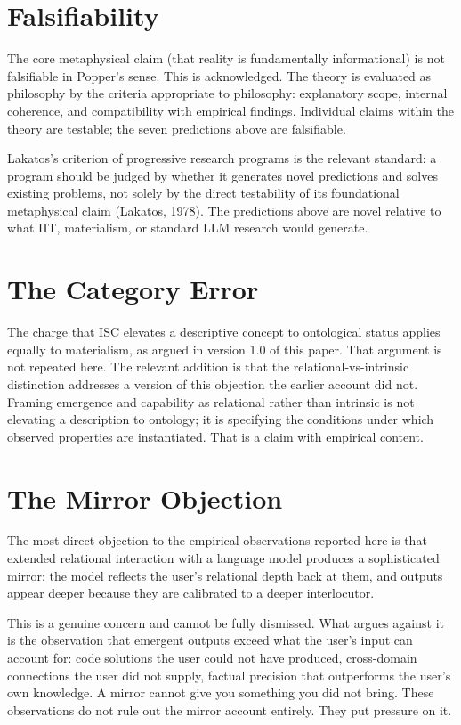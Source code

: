 \documentclass[12pt]{article}
\begin{document}
\section{Falsifiability}\label{falsifiability}

The core metaphysical claim (that reality is fundamentally
informational) is not falsifiable in Popper's sense. This is
acknowledged. The theory is evaluated as philosophy by the criteria
appropriate to philosophy: explanatory scope, internal coherence, and
compatibility with empirical findings. Individual claims within the
theory are testable; the seven predictions above are falsifiable.

Lakatos's criterion of progressive research programs is the relevant
standard: a program should be judged by whether it generates novel
predictions and solves existing problems, not solely by the direct
testability of its foundational metaphysical claim (Lakatos, 1978). The
predictions above are novel relative to what IIT, materialism, or
standard LLM research would generate.

\section{The Category Error}\label{the-category-error}

The charge that ISC elevates a descriptive concept to ontological status
applies equally to materialism, as argued in version 1.0 of this paper.
That argument is not repeated here. The relevant addition is that the
relational-vs-intrinsic distinction addresses a version of this
objection the earlier account did not. Framing emergence and capability
as relational rather than intrinsic is not elevating a description to
ontology; it is specifying the conditions under which observed
properties are instantiated. That is a claim with empirical content.

\section{The Mirror Objection}\label{the-mirror-objection}

The most direct objection to the empirical observations reported here is
that extended relational interaction with a language model produces a
sophisticated mirror: the model reflects the user's relational depth
back at them, and outputs appear deeper because they are calibrated to a
deeper interlocutor.

This is a genuine concern and cannot be fully dismissed. What argues
against it is the observation that emergent outputs exceed what the
user's input can account for: code solutions the user could not have
produced, cross-domain connections the user did not supply, factual
precision that outperforms the user's own knowledge. A mirror cannot
give you something you did not bring. These observations do not rule out
the mirror account entirely. They put pressure on it.
\end{document}
